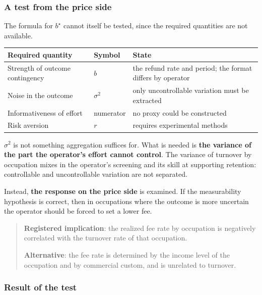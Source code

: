 \subsubsection{A test from the price side}
\label{sec:what-to-measure}

The formula for $b^\star$ cannot itself be tested, since the required quantities are not
available.

\begin{center}
\begin{tabularx}{\textwidth}{@{}llX@{}}
\toprule
Required quantity & Symbol & State \\
\midrule
Strength of outcome contingency & $b$ & the refund rate and period; the format differs by operator \\
Noise in the outcome & $\sigma^2$ & only uncontrollable variation must be extracted \\
Informativeness of effort & numerator & no proxy could be constructed \\
Risk aversion & $r$ & requires experimental methods \\
\bottomrule
\end{tabularx}
\label{tab:bstar-requirements}
\end{center}

$\sigma^2$ is not something aggregation suffices for. What is needed is \textbf{the variance of
the part the operator's effort cannot control}. The variance of turnover by occupation mixes in
the operator's screening and its skill at supporting retention: controllable and uncontrollable
variation are not separated.

Instead, \textbf{the response on the price side} is examined. If the measurability hypothesis is
correct, then in occupations where the outcome is more uncertain the operator should be forced to
set a lower fee.

\begin{quote}
\textbf{Registered implication}: the realized fee rate by occupation is negatively correlated with
the turnover rate of that occupation.

\textbf{Alternative}: the fee rate is determined by the income level of the occupation and by
commercial custom, and is unrelated to turnover.
\end{quote}

\subsubsection{Result of the test}
\label{sec:predX-result}

